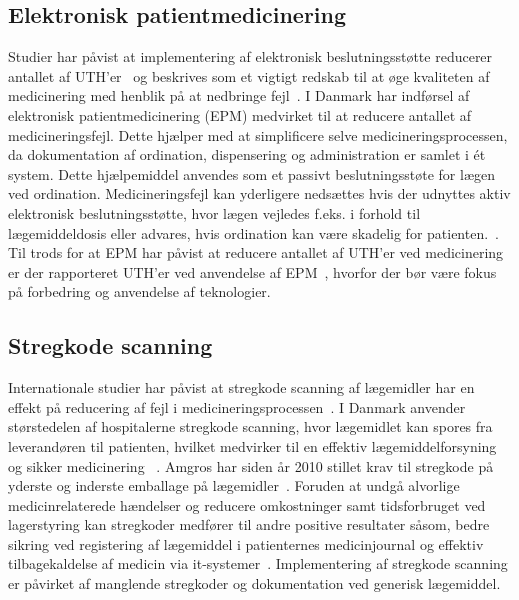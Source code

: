 \subsection{Elektronisk patientmedicinering}
Studier har påvist at implementering af elektronisk beslutningsstøtte reducerer antallet af UTH'er~\citep{DW1998,Bates2013,Cheng2011,Raboel2005} og beskrives som et vigtigt redskab til at øge kvaliteten af medicinering med henblik på at nedbringe fejl~\citep{Raboel2005}. I Danmark har indførsel af elektronisk patientmedicinering (EPM) medvirket til at reducere antallet af medicineringsfejl. Dette hjælper med at simplificere selve medicineringsprocessen, da dokumentation af ordination, dispensering og administration er samlet i ét system. Dette hjælpemiddel anvendes som et passivt beslutningsstøte for lægen ved ordination. Medicineringsfejl kan yderligere nedsættes hvis der udnyttes aktiv elektronisk beslutningsstøtte, hvor lægen vejledes f.eks. i forhold til lægemiddeldosis eller advares, hvis ordination kan være skadelig for patienten.~\citep{Raboel2005}. Til trods for at EPM har påvist at reducere antallet af UTH'er ved medicinering er der rapporteret UTH'er ved anvendelse af EPM~\citep{Syddanmark2008}, hvorfor der bør være fokus på forbedring og anvendelse af teknologier. 


\subsection{Stregkode scanning}
Internationale studier har påvist at stregkode scanning af lægemidler har en effekt på reducering af fejl i medicineringsprocessen~\citep{Poon2006,Bates2000,Levtzion-korach2010}. I Danmark anvender størstedelen af hospitalerne stregkode scanning, hvor lægemidlet kan spores fra leverandøren til patienten, hvilket medvirker til en effektiv lægemiddelforsyning og sikker medicinering ~\citep{Dzik2007,DPSD2008,Amgros2013}. Amgros har siden år 2010 stillet krav til stregkode på yderste og inderste emballage på lægemidler~\citep{Amgros2013}. Foruden at undgå alvorlige medicinrelaterede hændelser og reducere omkostninger samt tidsforbruget ved lagerstyring kan stregkoder medfører til andre positive resultater såsom, bedre sikring ved registering af lægemiddel i patienternes medicinjournal og effektiv tilbagekaldelse af medicin via it-systemer~\citep{Amgros2013}.
Implementering af stregkode scanning er påvirket af manglende stregkoder og dokumentation ved generisk lægemiddel. 

